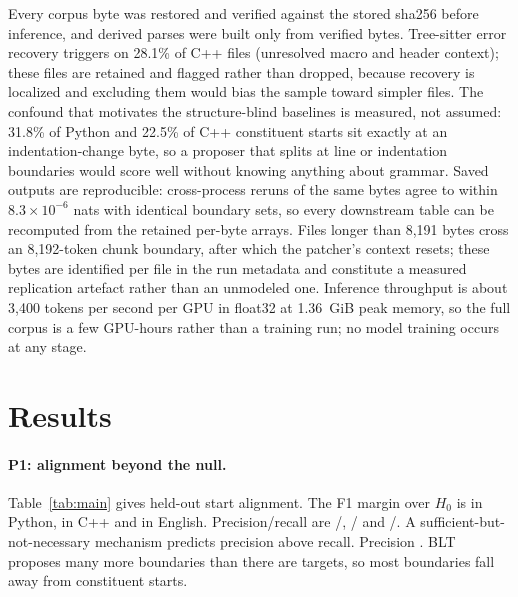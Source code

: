 Every corpus byte was restored and verified against the stored sha256 before inference, and derived parses were built only from verified bytes. Tree-sitter error recovery triggers on 28.1\% of C++ files (unresolved macro and header context); these files are retained and flagged rather than dropped, because recovery is localized and excluding them would bias the sample toward simpler files. The confound that motivates the structure-blind baselines is measured, not assumed: 31.8\% of Python and 22.5\% of C++ constituent starts sit exactly at an indentation-change byte, so a proposer that splits at line or indentation boundaries would score well without knowing anything about grammar. Saved outputs are reproducible: cross-process reruns of the same bytes agree to within $8.3\times10^{-6}$ nats with identical boundary sets, so every downstream table can be recomputed from the retained per-byte arrays. Files longer than 8{,}191 bytes cross an 8{,}192-token chunk boundary, after which the patcher's context resets; these bytes are identified per file in the run metadata and constitute a measured replication artefact rather than an unmodeled one. Inference throughput is about 3{,}400 tokens per second per GPU in float32 at 1.36~GiB peak memory, so the full corpus is a few GPU-hours rather than a training run; no model training occurs at any stage.

\section{Results}
\TableMain
\paragraph{P1: alignment beyond the null.} Table~\ref{tab:main} gives held-out start alignment. The F1 margin over $H_0$ is \MarginPy{} \MarginCIPy{} in Python, \MarginCpp{} \MarginCICpp{} in C++ and \MarginEn{} \MarginCIEn{} in English. Precision/recall are \PrecPy{}/\RecPy{}, \PrecCpp{}/\RecCpp{} and \PrecEn{}/\RecEn{}. A sufficient-but-not-necessary mechanism predicts precision above recall. Precision \PrecRecAll{}. BLT proposes many more boundaries than there are targets, so most boundaries fall away from constituent starts.

